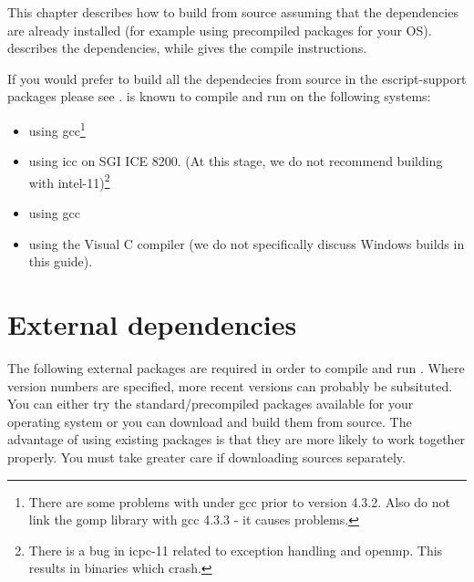 %
%
%



This chapter describes how to build \esfinley from source assuming that the dependencies are already installed (for example using precompiled packages for your OS).
 describes the dependencies, while  gives the compile instructions.

If you would prefer to build all the dependecies from source in the escript-support packages please see .
\esfinley is known to compile and run on the following systems:
\begin{itemize}
 \item \linux using gcc\footnote{There are some problems with \openmp under gcc prior to version 4.3.2. Also do not link the gomp library with gcc 4.3.3 - it causes problems.}
\item \linux using icc on SGI ICE 8200. (At this stage, we do not recommend building with intel-11)\footnote{There is a bug in icpc-11 related to exception handling and openmp. This results in binaries which crash.}
\item \macosx using gcc
\item \winxp using the Visual C compiler (we do not specifically discuss Windows builds in this guide).
\end{itemize}

\section{External dependencies}
\label{sec:deps}
The following external packages are required in order to compile and run \esfinley.
Where version numbers are specified, more recent versions can probably be subsituted.
You can either try the standard/precompiled packages available for your operating system or you can download and build them from source.
The advantage of using existing packages is that they are more likely to work together properly.
You must take greater care if downloading sources separately.

